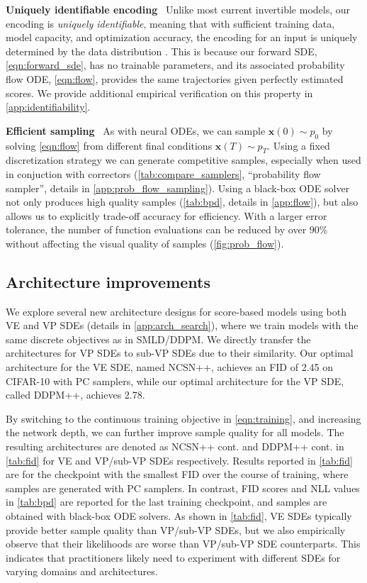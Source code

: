 \textbf{Uniquely identifiable encoding}~ Unlike most current invertible models, our encoding is {\em uniquely identifiable}, meaning that with sufficient training data, model capacity, and optimization accuracy, the encoding for an input is uniquely determined by the data distribution \citep{roeder2020linear}. This is because our forward SDE, \ref{eqn:forward_sde}, has no trainable parameters, and its associated probability flow ODE, \ref{eqn:flow}, provides the same trajectories given perfectly estimated scores. We provide additional empirical verification on this property in \ref{app:identifiability}.

\textbf{Efficient sampling}~ As with neural ODEs, we can sample $\mathbf{x}(0) \sim p_0$ by solving \ref{eqn:flow} from different final conditions $\mathbf{x}(T)\sim p_T$. Using a fixed discretization strategy we can generate competitive samples, especially when used in conjuction with correctors (\ref{tab:compare_samplers},  ``probability flow sampler'', details in \ref{app:prob_flow_sampling}). Using a black-box ODE solver~\citep{dormand1980family} not only produces high quality samples (\ref{tab:bpd}, details in \ref{app:flow}), but also allows us to explicitly trade-off accuracy for efficiency. With a larger error tolerance, the number of function evaluations can be reduced by over $90\%$ without affecting the visual quality of samples (\ref{fig:prob_flow}).

\subsection{Architecture improvements}\label{sec:arch}

We explore several new architecture designs for score-based models using both VE and VP SDEs (details in \ref{app:arch_search}), where we train models with the same discrete objectives as in SMLD/DDPM. We directly transfer the architectures for VP SDEs to sub-VP SDEs due to their similarity. Our optimal architecture for the VE SDE, named NCSN++, achieves an FID of 2.45 on CIFAR-10 with PC samplers, while our optimal architecture for the VP SDE, called DDPM++, achieves 2.78.

By switching to the continuous training objective in \ref{eqn:training}, and increasing the network depth, we can further improve sample quality for all models. The resulting architectures are denoted as NCSN++ cont. and DDPM++ cont. in \ref{tab:fid} for VE and VP/sub-VP SDEs respectively. Results reported in \ref{tab:fid} are for the checkpoint with the smallest FID over the course of training, where samples are generated with PC samplers. In contrast, FID scores and NLL values in \ref{tab:bpd} are reported for the last training checkpoint, and samples are obtained with black-box ODE solvers. As shown in \ref{tab:fid}, VE SDEs typically provide better sample quality than VP/sub-VP SDEs, but we also empirically observe that their likelihoods are worse than VP/sub-VP SDE counterparts. This indicates that practitioners likely need to experiment with different SDEs for varying domains and architectures.

